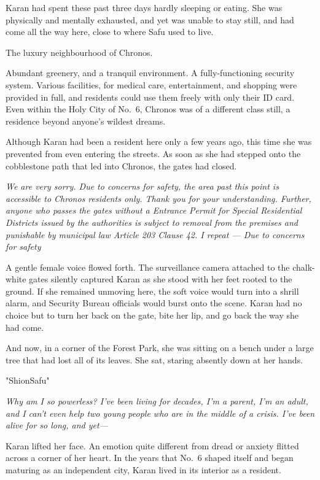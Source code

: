 Karan had spent these past three days hardly sleeping or eating. She was
physically and mentally exhausted, and yet was unable to stay still, and
had come all the way here, close to where Safu used to live.

The luxury neighbourhood of Chronos.

Abundant greenery, and a tranquil environment. A fully-functioning
security system. Various facilities, for medical care, entertainment,
and shopping were provided in full, and residents could use them freely
with only their ID card. Even within the Holy City of No.~6, Chronos was
of a different class still, a residence beyond anyone's wildest dreams.

Although Karan had been a resident here only a few years ago, this time
she was prevented from even entering the streets. As soon as she had
stepped onto the cobblestone path that led into Chronos, the gates had
closed.

\emph{We are very sorry. Due to concerns for safety, the area past this point
is accessible to Chronos residents only. Thank you for your
understanding. Further, anyone who passes the gates without a Entrance
Permit for Special Residential Districts issued by the authorities is
subject to removal from the premises and punishable by municipal law
Article 203 Clause 42. I repeat --- Due to concerns for safety\el }

A gentle female voice flowed forth. The surveillance camera attached to
the chalk-white gates silently captured Karan as she stood with her feet
rooted to the ground. If she remained unmoving here, the soft voice
would turn into a shrill alarm, and Security Bureau officials would
burst onto the scene. Karan had no choice but to turn her back on the
gate, bite her lip, and go back the way she had come.

And now, in a corner of the Forest Park, she was sitting on a bench
under a large tree that had lost all of its leaves. She sat, staring
absently down at her hands.

"Shion\el Safu\el "

\emph{Why am I so powerless? I've been living for decades, I'm a parent, I'm
an adult, and I can't even help two young people who are in the middle
of a crisis. I've been alive for so long, and yet---}

Karan lifted her face. An emotion quite different from dread or anxiety
flitted across a corner of her heart. In the years that No.~6 shaped
itself and began maturing as an independent city, Karan lived in its
interior as a resident.


